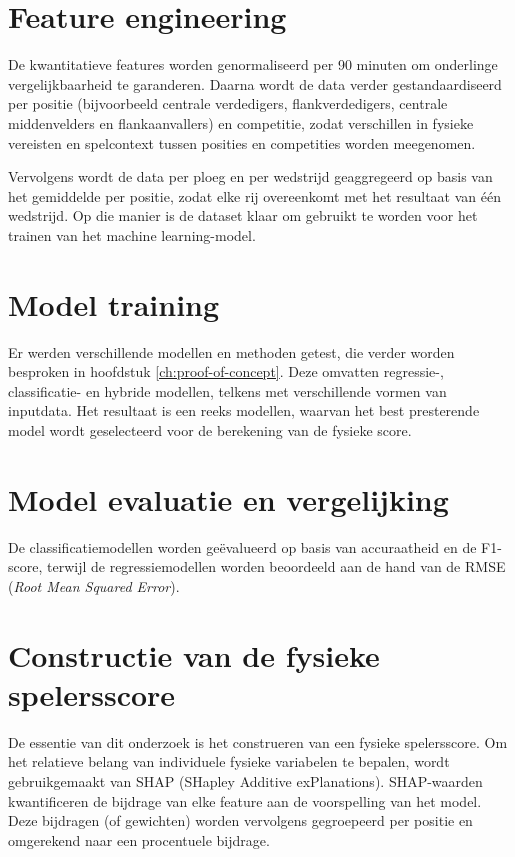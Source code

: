 \section{Feature engineering}

De kwantitatieve features worden genormaliseerd per 90 minuten om onderlinge vergelijkbaarheid te garanderen. Daarna wordt de data verder gestandaardiseerd per positie (bijvoorbeeld centrale verdedigers, flankverdedigers, centrale middenvelders en flankaanvallers) en competitie, zodat verschillen in fysieke vereisten en spelcontext tussen posities en competities worden meegenomen.

Vervolgens wordt de data per ploeg en per wedstrijd geaggregeerd op basis van het gemiddelde per positie, zodat elke rij overeenkomt met het resultaat van één wedstrijd. Op die manier is de dataset klaar om gebruikt te worden voor het trainen van het machine learning-model.

\section{Model training}

Er werden verschillende modellen en methoden getest, die verder worden besproken in hoofdstuk \ref{ch:proof-of-concept}. Deze omvatten regressie-, classificatie- en hybride modellen, telkens met verschillende vormen van inputdata. Het resultaat is een reeks modellen, waarvan het best presterende model wordt geselecteerd voor de berekening van de fysieke score.

\section{Model evaluatie en vergelijking}

De classificatiemodellen worden geëvalueerd op basis van accuraatheid en de F1-score, terwijl de regressiemodellen worden beoordeeld aan de hand van de RMSE (\emph{Root Mean Squared Error}).

\section{Constructie van de fysieke spelersscore}

De essentie van dit onderzoek is het construeren van een fysieke spelersscore. Om het relatieve belang van individuele fysieke variabelen te bepalen, wordt gebruikgemaakt van SHAP (SHapley Additive exPlanations). SHAP-waarden kwantificeren de bijdrage van elke feature aan de voorspelling van het model. Deze bijdragen (of gewichten) worden vervolgens gegroepeerd per positie en omgerekend naar een procentuele bijdrage.

